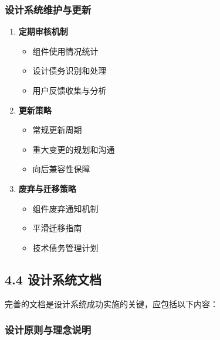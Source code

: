 \subsubsection{设计系统维护与更新}\label{ux8bbeux8ba1ux7cfbux7edfux7ef4ux62a4ux4e0eux66f4ux65b0}

\begin{enumerate}
\def\labelenumi{\arabic{enumi}.}
\tightlist
\item
  \textbf{定期审核机制}

  \begin{itemize}
  \tightlist
  \item
    组件使用情况统计
  \item
    设计债务识别和处理
  \item
    用户反馈收集与分析
  \end{itemize}
\item
  \textbf{更新策略}

  \begin{itemize}
  \tightlist
  \item
    常规更新周期
  \item
    重大变更的规划和沟通
  \item
    向后兼容性保障
  \end{itemize}
\item
  \textbf{废弃与迁移策略}

  \begin{itemize}
  \tightlist
  \item
    组件废弃通知机制
  \item
    平滑迁移指南
  \item
    技术债务管理计划
  \end{itemize}
\end{enumerate}

\subsection{4.4
设计系统文档}\label{ux8bbeux8ba1ux7cfbux7edfux6587ux6863}

完善的文档是设计系统成功实施的关键，应包括以下内容：

\subsubsection{设计原则与理念说明}\label{ux8bbeux8ba1ux539fux5219ux4e0eux7406ux5ff5ux8bf4ux660e}

